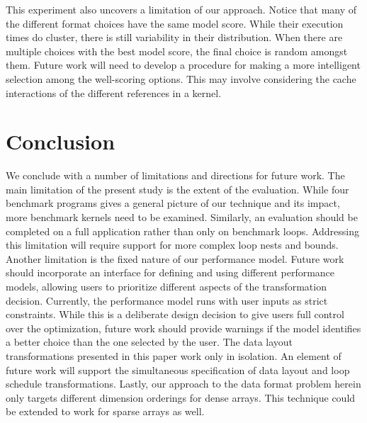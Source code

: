 \documentclass[sigconf]{acmart}
\begin{document}
This experiment also uncovers a limitation of our approach.
Notice that many of the different format choices have the same model score.
While their execution times do cluster, there is still variability in their distribution.
When there are multiple choices with   the best model score, the final choice is random amongst them.
Future work will need to develop a procedure for making a more intelligent selection among the well-scoring options. 
This may involve considering the cache interactions of the different references in a kernel. 


\section{Conclusion}


We conclude with a number of limitations and directions for future work.
The main limitation of the present study is the extent of the evaluation.
While four benchmark programs gives a general picture of our technique and its impact, more benchmark kernels need to be examined.
Similarly, an evaluation should be completed on a full application rather than only on benchmark loops.
Addressing this limitation will require support for more complex loop nests and bounds.
Another limitation is the fixed nature of our performance model.
Future work should incorporate an interface for defining and using different performance models, allowing users to prioritize different aspects of the transformation decision.
Currently, the performance model runs with user inputs as strict constraints.
While this is a deliberate design decision to give users full control over the optimization, future work should provide warnings if the model identifies a better choice than the one selected by the user. 
The data layout transformations presented in this paper work only in isolation. 
An element of future work will support the simultaneous specification of data layout and loop schedule transformations. 
Lastly, our approach to the data format problem herein only targets different dimension orderings for dense arrays. 
This technique could be extended to work for sparse arrays as well. 

\balance



\end{document}
